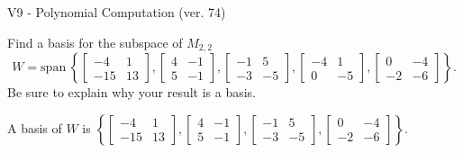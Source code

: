 \begin{exercise}
  \begin{exerciseTitle}V9 - Polynomial Computation (ver. 74)\end{exerciseTitle}
  \begin{exerciseStatement}
    Find a basis for the subspace of \(M_{2,2}\) 
\[W=\mathrm{span}\ \left\{\left[\begin{array}{cc}
-4 & 1 \\
-15 & 13
\end{array}\right] , \left[\begin{array}{cc}
4 & -1 \\
5 & -1
\end{array}\right] , \left[\begin{array}{cc}
-1 & 5 \\
-3 & -5
\end{array}\right] , \left[\begin{array}{cc}
-4 & 1 \\
0 & -5
\end{array}\right] , \left[\begin{array}{cc}
0 & -4 \\
-2 & -6
\end{array}\right]\right\}.\]
 Be sure to explain why your result is a basis.


  \end{exerciseStatement}
  \begin{exerciseAnswer}
   A basis of \(W\) is  \(\left\{\left[\begin{array}{cc}
-4 & 1 \\
-15 & 13
\end{array}\right] , \left[\begin{array}{cc}
4 & -1 \\
5 & -1
\end{array}\right] , \left[\begin{array}{cc}
-1 & 5 \\
-3 & -5
\end{array}\right] , \left[\begin{array}{cc}
0 & -4 \\
-2 & -6
\end{array}\right]\right\}\).
  


  \end{exerciseAnswer}
\end{exercise}